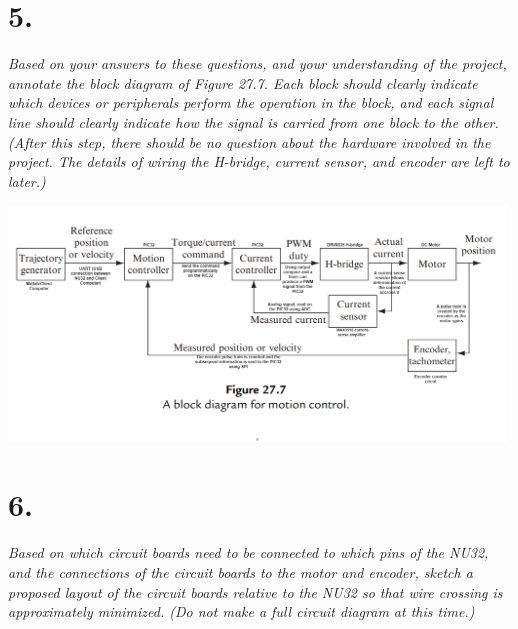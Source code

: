 \documentclass[12pt]{article}
\begin{document}
\section*{5.}
\textit{Based on your answers to these questions, and your understanding of the project, annotate the block diagram of Figure 27.7. Each block should clearly indicate which devices or peripherals perform the operation in the block, and each signal line should clearly indicate how the signal is carried from one block to the other. (After this step, there should be no question about the hardware involved in the project. The details of wiring the H-bridge, current sensor, and encoder are left to later.)}

\begin{center}
    \includegraphics[width=5.2in]{fig27_7_labelled.png}
\end{center}

\section*{6.}
\textit{Based on which circuit boards need to be connected to which pins of the NU32, and the connections of the circuit boards to the motor and encoder, sketch a proposed layout of the circuit boards relative to the NU32 so that wire crossing is approximately minimized. (Do not make a full circuit diagram at this time.)}
\end{document}
